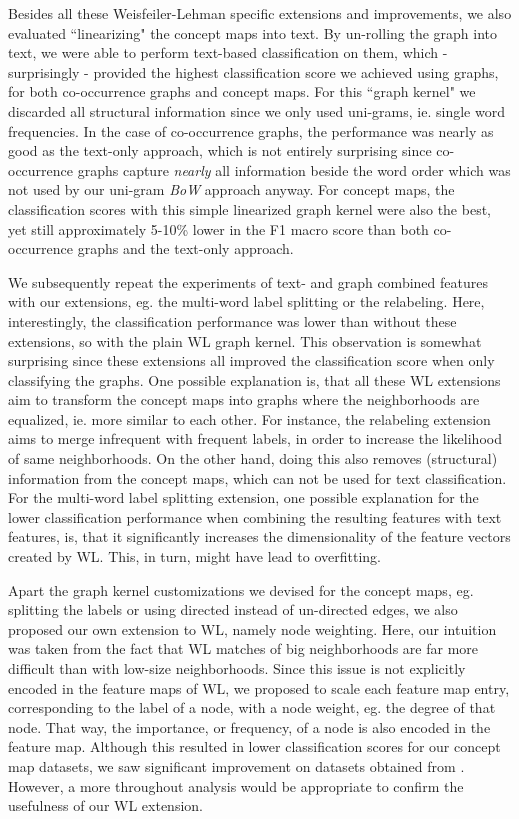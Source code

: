 Besides all these Weisfeiler-Lehman specific extensions and improvements, we also evaluated ``linearizing" the concept maps into text.
By un-rolling the graph into text, we were able to perform text-based classification on them, which - surprisingly - provided the highest classification score we achieved using graphs, for both co-occurrence graphs and concept maps.
For this ``graph kernel" we discarded all structural information since we only used uni-grams, ie. single word frequencies.
In the case of co-occurrence graphs, the performance was nearly as good as the text-only approach, which is not entirely surprising since co-occurrence graphs capture \textit{nearly} all information beside the word order which was not used by our uni-gram \textit{BoW} approach anyway.
For concept maps, the classification scores with this simple linearized graph kernel were also the best, yet still approximately 5-10\% lower in the F1 macro score than both co-occurrence graphs and the text-only approach.

We subsequently repeat the experiments of text- and graph combined features with our extensions, eg. the multi-word label splitting or the relabeling.
Here, interestingly, the classification performance was lower than without these extensions, so with the plain WL graph kernel.
This observation is somewhat surprising since these extensions all improved the classification score when only classifying the graphs.
One possible explanation is, that all these WL extensions aim to transform the concept maps into graphs where the neighborhoods are equalized, ie. more similar to each other.
For instance, the relabeling extension aims to merge infrequent with frequent labels, in order to increase the likelihood of same neighborhoods.
On the other hand, doing this also removes (structural) information from the concept maps, which can not be used for text classification.
For the multi-word label splitting extension, one possible explanation for the lower classification performance when combining the resulting features with text features, is, that it significantly increases the dimensionality of the feature vectors created by WL.
This, in turn, might have lead to overfitting.

Apart the graph kernel customizations we devised for the concept maps, eg. splitting the labels or using directed instead of un-directed edges, we also proposed our own extension to WL, namely node weighting.
Here, our intuition was taken from the fact that WL matches of big neighborhoods are far more difficult than with low-size neighborhoods.
Since this issue is not explicitly encoded in the feature maps of WL, we proposed to scale each feature map entry, corresponding to the label of a node, with a node weight, eg. the degree of that node.
That way, the importance, or frequency, of a node is also encoded in the feature map.
Although this resulted in lower classification scores for our concept map datasets, we saw significant improvement on datasets obtained from \cite{Kersting2016}.
However, a more throughout analysis would be appropriate to confirm the usefulness of our WL extension.

